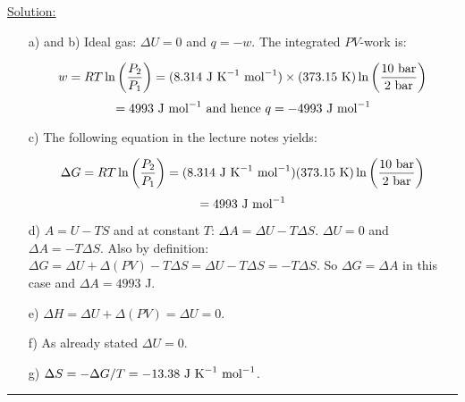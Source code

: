 \noindent
\underline{Solution:}\\

\begin{itemize}

\item[a) and b)] Ideal gas: $\Delta U = 0$ and $q = -w$. The integrated $PV$-work is:

$$w = RT\ln\left(\frac{P_2}{P_1}\right) = (8.314\textnormal{ J K}^{-1}\textnormal{ mol}^{-1})\times (373.15\textnormal{ K})\ln\left(\frac{10\textnormal{ bar}}{2\textnormal{ bar}}\right)$$
$$ = 4993\textnormal{ J mol}^{-1}\textnormal{ and hence }q = -4993\textnormal{ J mol}^{-1}$$

\item[c)] The following equation in the lecture notes yields:

$$\Delta G = RT\ln\left(\frac{P_2}{P_1}\right) = (8.314\textnormal{ J K}^{-1}\textnormal{ mol}^{-1})(373.15\textnormal{ K})\ln\left(\frac{10\textnormal{ bar}}{2\textnormal{ bar}}\right)$$
$$ = 4993\textnormal{ J mol}^{-1}$$

\item[d)] $A = U - TS$ and at constant $T$: $\Delta A = \Delta U - T\Delta S$. $\Delta U = 0$ and $\Delta A = -T\Delta S$. Also by definition: $\Delta G = \Delta U + \Delta(PV) - T\Delta S = \Delta U - T\Delta S = -T\Delta S$. So $\Delta G = \Delta A$ in this case and $\Delta A = 4993$ J.

\item[e)] $\Delta H = \Delta U + \Delta(PV) = \Delta U = 0$.

\item[f)] As already stated $\Delta U = 0$.

\item[g)] $\Delta S = -\Delta G / T = -13.38\textnormal{ J K}^{-1}\textnormal{ mol}^{-1}$.

\end{itemize}

\hrule\vspace{0.5cm}

